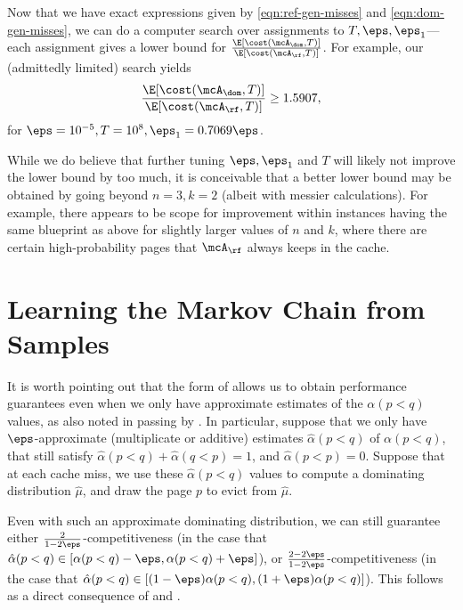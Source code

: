 \documentclass[11pt]{article}
\begin{document}
Now that we have exact expressions given by \eqref{eqn:ref-gen-misses} and \eqref{eqn:dom-gen-misses}, we can do a computer search over assignments to $T, \eps, \eps_1$---each assignment gives a lower bound for $\frac{\E[\cost(\mcA_\dom, T)]}{\E[\cost(\mcA_\rf, T)]}$. For example, our (admittedly limited) search yields
\begin{align*}
    \frac{\E[\cost(\mcA_\dom, T)]}{\E[\cost(\mcA_\rf, T)]} \ge 1.5907,
\end{align*}
for $\eps=10^{-5}, T=10^8, \eps_1=0.7069\eps$.

\begin{remark}
    \label{remark:potential-improving-lower-bound}
    While we do believe that further tuning $\eps, \eps_1$ and $T$ will likely not improve the lower bound by too much, it is conceivable that a better lower bound may be obtained by going beyond $n=3, k=2$ (albeit with messier calculations). For example, there appears to be scope for improvement within instances having the same blueprint as above for slightly larger values of $n$ and $k$, where there are certain high-probability pages that $\mcA_\rf$ always keeps in the cache.
\end{remark}
 \section{Learning the Markov Chain from Samples}
\label{sec:robustness}

It is worth pointing out that the form of  allows us to obtain performance guarantees even when we only have approximate estimates of the $\alpha(p<q)$ values, as also noted in passing by \cite{lund1999paging}. In particular, suppose that we only have $\eps$-approximate (multiplicate or additive) estimates $\hat{\alpha}(p<q)$ of $\alpha(p<q)$, that still satisfy $\hat{\alpha}(p<q) + \hat{\alpha}(q<p)=1$, and $\hat{\alpha}(p<p)=0$. Suppose that at each cache miss, we use these $\hat{\alpha}(p<q)$ values to compute a dominating distribution $\hat{\mu}$, and draw the page $p$ to evict from $\hat{\mu}$.

Even with such an approximate dominating distribution, we can still guarantee either $\frac{2}{1-2\eps}$-competitiveness (in the case that $\hat{\alpha}(p<q) \in [\alpha(p<q)-\eps, \alpha(p<q)+\eps]$), or $\frac{2-2\eps}{1-2\eps}$-competitiveness (in the case that $\hat{\alpha}(p<q) \in [(1-\eps)\alpha(p<q), (1+\eps)\alpha(p<q)]$). This follows as a direct consequence of  and .
\end{document}
